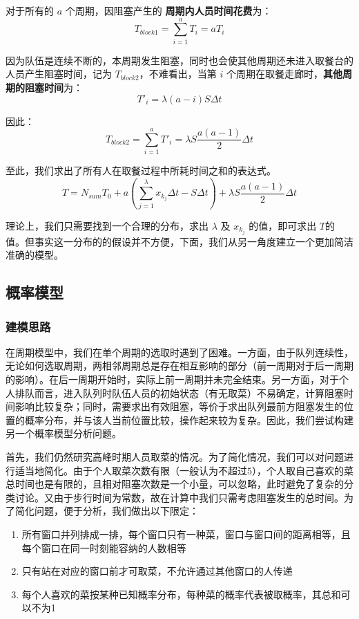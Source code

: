 \documentclass[lang=cn,10pt,a4paper]{elegantpaper}
\begin{document}
对于所有的 $a$ 个周期，因阻塞产生的 \textbf{周期内人员时间花费}为：
$$
T_{block1}=\sum_{i=1}^{a}T_i=aT_i
$$


​因为队伍是连续不断的，本周期发生阻塞，同时也会使其他周期还未进入取餐台的人员产生阻塞时间，记为 $T_{block2}$，不难看出，当第 $i$ 个周期在取餐走廊时，\textbf{其他周期的阻塞时间}为：
$$
T'_{i}=\lambda(a-i)S\Delta t
$$


因此：
$$
T_{block2}=\sum_{i=1}^{a}T'_i=\lambda S \frac{a(a-1)}{2} \Delta t
$$


​至此，我们求出了所有人在取餐过程中所耗时间之和的表达式。
\begin{equation}
T=N_{sum}T_0+a(\sum_{j=1}^{\lambda}x_{k_j}\Delta t -S\Delta t)+\lambda S \frac{a(a-1)}{2} \Delta t
\end{equation}


理论上，我们只需要找到一个合理的分布，求出 $\lambda$ 及 $x_{k_j}$ 的值，即可求出 $T$的值。但事实这一分布的的假设并不方便，下面，我们从另一角度建立一个更加简洁准确的模型。
\subsection{概率模型}
\subsubsection{建模思路}
在周期模型中，我们在单个周期的选取时遇到了困难。一方面，由于队列连续性，无论如何选取周期，两相邻周期总是存在相互影响的部分（前一周期对于后一周期的影响）。在后一周期开始时，实际上前一周期并未完全结束。另一方面，对于个人排队而言，进入队列时队伍人员的初始状态（有无取菜）不易确定，计算阻塞时间影响比较复杂；同时，需要求出有效阻塞，等价于求出队列最前方阻塞发生的位置的概率分布，并与该人当前位置比较，操作起来较为复杂。因此，我们尝试构建另一个概率模型分析问题。


首先，我们仍然研究高峰时期人员取菜的情况。为了简化情况，我们可以对问题进行适当地简化。由于个人取菜次数有限（一般认为不超过$5$），个人取自己喜欢的菜总时间也是有限的，且相对阻塞次数是一个小量，可以忽略，此时避免了复杂的分类讨论。又由于步行时间为常数，故在计算中我们只需考虑阻塞发生的总时间。为了简化问题，便于分析，我们做出以下限定：
\begin{enumerate}
\item 所有窗口并列排成一排，每个窗口只有一种菜，窗口与窗口间的距离相等，且每个窗口在同一时刻能容纳的人数相等
\item 只有站在对应的窗口前才可取菜，不允许通过其他窗口的人传递
\item 每个人喜欢的菜按某种已知概率分布，每种菜的概率代表被取概率，其总和可以不为1
\end{enumerate}
\end{document}
